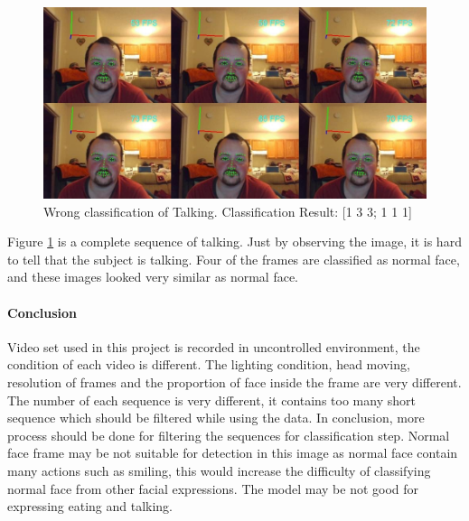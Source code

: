 \begin{figure}[ht]
\centering
\includegraphics[width = \textwidth]{imgs/Wrong_T00.jpg}
\caption{Wrong classification of Talking. Classification Result: [1 3 3; 1 1 1]}
\label{fig:EXPT}
\end{figure}
\newline
Figure \ref{fig:EXPT} is a complete sequence of talking. Just by observing the image, it is hard to tell that the subject is talking. Four of the frames are classified as normal face, and these images looked very similar as normal face.
\paragraph{Conclusion}
Video set used in this project is recorded in uncontrolled environment, the condition of each video is different. The lighting condition, head moving, resolution of frames and the proportion of face inside the frame are very different. The number of each sequence is very different, it contains too many short sequence which should be filtered while using the data. In conclusion, more process should be done for filtering the sequences for classification step. Normal face frame may be not suitable for detection in this image as normal face contain many actions such as smiling, this would increase the difficulty of classifying normal face from other facial expressions. The model may be not good for expressing eating and talking.